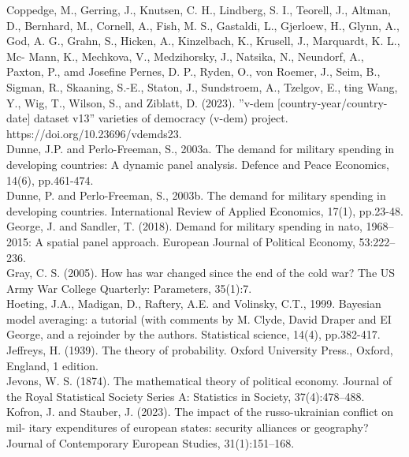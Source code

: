 \documentclass[12pt,a4paper]{article}
\begin{document}
Coppedge, M., Gerring, J., Knutsen, C. H., Lindberg, S. I., Teorell, J., Altman, D., Bernhard, M., Cornell, A., Fish, M. S., Gastaldi, L., Gjerloew, H., Glynn, A., God, A. G., Grahn, S., Hicken, A., Kinzelbach, K., Krusell, J., Marquardt, K. L., Mc- Mann, K., Mechkova, V., Medzihorsky, J., Natsika, N., Neundorf, A., Paxton, P., amd Josefine Pernes, D. P., Ryden, O., von Roemer, J., Seim, B., Sigman, R., Skaaning, S.-E., Staton, J., Sundstroem, A., Tzelgov, E., ting Wang, Y., Wig, T., Wilson, S., and Ziblatt, D. (2023). ”v-dem [country-year/country-date] dataset v13” varieties of democracy (v-dem) project. https://doi.org/10.23696/vdemds23. \\

Dunne, J.P. and Perlo-Freeman, S., 2003a. The demand for military spending in developing countries: A dynamic panel analysis. Defence and Peace Economics, 14(6), pp.461-474.\\

Dunne, P. and Perlo-Freeman, S., 2003b. The demand for military spending in developing countries. International Review of Applied Economics, 17(1), pp.23-48. \\

George, J. and Sandler, T. (2018). Demand for military spending in nato, 1968–2015: A spatial panel approach. European Journal of Political Economy, 53:222–236. \\

Gray, C. S. (2005). How has war changed since the end of the cold war? The US Army War College Quarterly: Parameters, 35(1):7. \\

Hoeting, J.A., Madigan, D., Raftery, A.E. and Volinsky, C.T., 1999. Bayesian model averaging: a tutorial (with comments by M. Clyde, David Draper and EI George, and a rejoinder by the authors. Statistical science, 14(4), pp.382-417. \\

Jeffreys, H. (1939). The theory of probability. Oxford University Press., Oxford, England, 1 edition. \\

Jevons, W. S. (1874). The mathematical theory of political economy. Journal of the Royal Statistical Society Series A: Statistics in Society, 37(4):478–488. \\

Kofron, J. and Stauber, J. (2023). The impact of the russo-ukrainian conflict on mil- itary expenditures of european states: security alliances or geography? Journal of Contemporary European Studies, 31(1):151–168. \\
\end{document}
